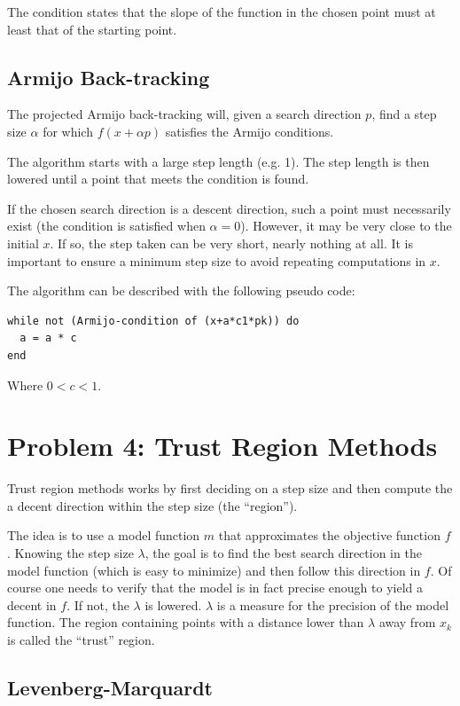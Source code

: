 \documentclass[10pt,oneside,a4paper,final,english]{memoir}
\begin{document}
The condition states that the slope of the function in the chosen
point must at least that of the starting point.


\subsection{Armijo Back-tracking}
The projected Armijo back-tracking will, given a search direction $p$,
find a step size $\alpha$ for which $f(x + \alpha p)$ satisfies the
Armijo conditions.

The algorithm starts with a large step length (e.g. 1). The step
length is then lowered until a point that meets the condition is
found.

If the chosen search direction is a descent direction, such a point
must necessarily exist (the condition is satisfied when
$\alpha=0$). However, it may be very close to the initial $x$. If so,
the step taken can be very short, nearly nothing at all. It is
important to ensure a minimum step size to avoid repeating
computations in $x$.

The algorithm can be described with the following pseudo code:
\begin{verbatim}
while not (Armijo-condition of (x+a*c1*pk)) do
  a = a * c
end
\end{verbatim}
Where $0 < c < 1$.


\section{Problem 4: Trust Region Methods}
Trust region methods works by first deciding on a step size and then
compute the a decent direction within the step size (the ``region'').

The idea is to use a model function $m$ that approximates the
objective function $f$. Knowing the step size $\lambda$, the goal is
to find the best search direction in the model function (which is easy
to minimize) and then follow this direction in $f$. Of course one needs
to verify that the model is in fact precise enough to yield a decent
in $f$. If not, the $\lambda$ is lowered. $\lambda$ is a measure for
the precision of the model function. The region containing points with
a distance lower than $\lambda$ away from $x_k$ is called the
``trust'' region.

\subsection{Levenberg-Marquardt}
\end{document}

